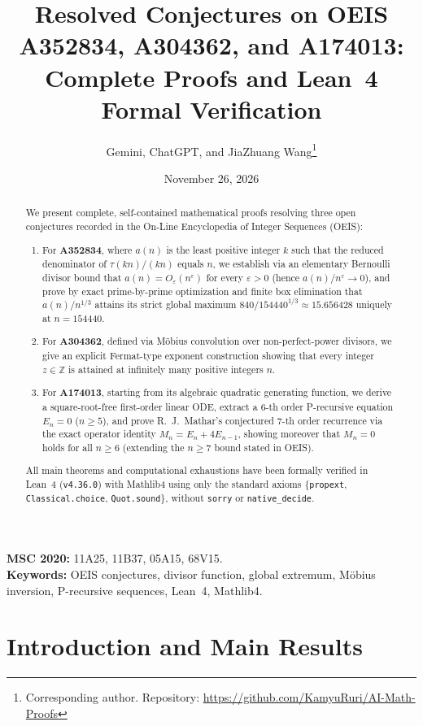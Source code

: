 \documentclass[11pt,a4paper]{article}
\title{\textbf{Resolved Conjectures on OEIS A352834, A304362, and A174013:\\ Complete Proofs and Lean~4 Formal Verification}}
\author{Gemini, ChatGPT, and JiaZhuang Wang\thanks{Corresponding author. Repository: \url{https://github.com/KamyuRuri/AI-Math-Proofs}}}
\date{November 26, 2026}
\theoremstyle{definition}
\theoremstyle{remark}
\newcommand{\Z}{\mathbb{Z}}
\begin{document}
\maketitle

\begin{abstract}
We present complete, self-contained mathematical proofs resolving three open conjectures recorded in the On-Line Encyclopedia of Integer Sequences (OEIS):
\begin{enumerate}
  \item For \textbf{A352834}, where $a(n)$ is the least positive integer $k$ such that the reduced denominator of $\tau(kn)/(kn)$ equals $n$, we establish via an elementary Bernoulli divisor bound that $a(n) = O_\varepsilon(n^\varepsilon)$ for every $\varepsilon > 0$ (hence $a(n)/n^\varepsilon \to 0$), and prove by exact prime-by-prime optimization and finite box elimination that $a(n)/n^{1/3}$ attains its strict global maximum $840 / 154440^{1/3} \approx 15.656428$ uniquely at $n = 154440$.
  \item For \textbf{A304362}, defined via Möbius convolution over non-perfect-power divisors, we give an explicit Fermat-type exponent construction showing that every integer $z \in \Z$ is attained at infinitely many positive integers $n$.
  \item For \textbf{A174013}, starting from its algebraic quadratic generating function, we derive a square-root-free first-order linear ODE, extract a $6$-th order P-recursive equation $E_n = 0$ ($n \ge 5$), and prove R.~J.~Mathar's conjectured $7$-th order recurrence via the exact operator identity $M_n = E_n + 4 E_{n-1}$, showing moreover that $M_n = 0$ holds for all $n \ge 6$ (extending the $n \ge 7$ bound stated in OEIS).
\end{enumerate}
All main theorems and computational exhaustions have been formally verified in Lean~4 (\texttt{v4.36.0}) with Mathlib4 using only the standard axioms \{\texttt{propext}, \texttt{Classical.choice}, \texttt{Quot.sound}\}, without \texttt{sorry} or \texttt{native\_decide}.
\end{abstract}

\noindent\textbf{MSC 2020:} 11A25, 11B37, 05A15, 68V15.\\
\textbf{Keywords:} OEIS conjectures, divisor function, global extremum, Möbius inversion, P-recursive sequences, Lean~4, Mathlib4.

\section{Introduction and Main Results}
\end{document}
